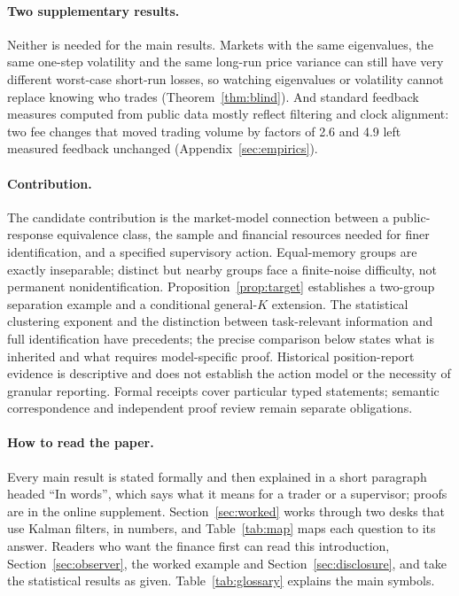 \documentclass[12pt]{article}
\theoremstyle{definition}
\theoremstyle{remark}
\begin{document}
\paragraph{Two supplementary results.} Neither is needed for the main results. Markets with the same eigenvalues, the same one-step volatility and the same long-run price variance can still have very different worst-case short-run losses, so watching eigenvalues or volatility cannot replace knowing who trades (Theorem~\ref{thm:blind}). And standard feedback measures computed from public data mostly reflect filtering and clock alignment: two fee changes that moved trading volume by factors of 2.6 and 4.9 left measured feedback unchanged (Appendix~\ref{sec:empirics}).

\paragraph{Contribution.} The candidate contribution is the market-model connection between a public-response equivalence class, the sample and financial resources needed for finer identification, and a specified supervisory action. Equal-memory groups are exactly inseparable; distinct but nearby groups face a finite-noise difficulty, not permanent nonidentification. Proposition~\ref{prop:target} establishes a two-group separation example and a conditional general-$K$ extension. The statistical clustering exponent and the distinction between task-relevant information and full identification have precedents; the precise comparison below states what is inherited and what requires model-specific proof. Historical position-report evidence is descriptive and does not establish the action model or the necessity of granular reporting. Formal receipts cover particular typed statements; semantic correspondence and independent proof review remain separate obligations.

\paragraph{How to read the paper.} Every main result is stated formally and then explained in a short paragraph headed ``In words'', which says what it means for a trader or a supervisor; proofs are in the online supplement. Section~\ref{sec:worked} works through two desks that use Kalman filters, in numbers, and Table~\ref{tab:map} maps each question to its answer. Readers who want the finance first can read this introduction, Section~\ref{sec:observer}, the worked example and Section~\ref{sec:disclosure}, and take the statistical results as given. Table~\ref{tab:glossary} explains the main symbols.
\end{document}
